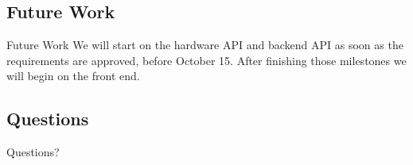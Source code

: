 \documentclass[17pt, aspectratio=169]{beamer}
\begin{document}
\subsection{Future Work}
\begin{frame}{Future Work}
	We will start on the hardware API and backend API as soon as the requirements are approved, before October 15. After finishing those milestones we will begin on the front end.
\end{frame}
\subsection*{Questions}
\begin{frame}
	\begin{huge}
		\begin{center}
			Questions?
		\end{center}
	\end{huge}
\end{frame}
\end{document}
